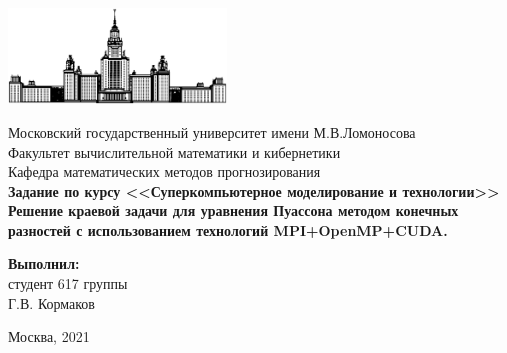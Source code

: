 \documentclass[12pt, fleqn]{article}
\theoremstyle{definition}
\begin{document}
\hypersetup{pageanchor=false}
\begin{titlepage}
\begin{center}
    \includegraphics[width=58mm]{msu.eps}
    
    Московский государственный университет имени М.В.Ломоносова\\
    Факультет вычислительной математики и кибернетики\\
    Кафедра математических методов прогнозирования\\[25mm]

    \textsf{
        \Large\bfseries 
        Задание по курсу <<Суперкомпьютерное моделирование и технологии>>
        \\[5mm] 
        Решение краевой задачи для уравнения Пуассона методом конечных разностей с использованием технологий MPI+OpenMP+CUDA.
    }\\[12mm]
    
    \begin{flushright}
        \parbox{0.5\textwidth}{
        \begin{flushright}
            \textbf{Выполнил:}\\
            студент 617 группы \\
            Г.В. Кормаков
        \end{flushright}
        }
    \end{flushright}

    \vspace{\fill}
    Москва, 2021
\end{center}

\end{titlepage}
\hypersetup{pageanchor=true}
\tableofcontents
\newpage
\end{document}
